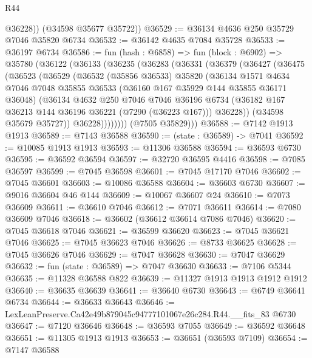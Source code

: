 \begin{lexlean}{R44}
\begin{coremodule}
{          @36228))
      (@34598 @35677 @35722))
@36529 := @36134 @4636 @250 @35729 @7046 @35820 @6734
@36532 := @36142 @4635 @7084 @35728
@36533 := @36197 @6734
@36586 := fun (hash : @6858) =>
  fun (block : @6902) =>
  @35780
    (@36122
      (@36133
        (@36235
          (@36283
            (@36331
              (@36379
                (@36427
                  (@36475
                    (@36523
                      (@36529
                        (@36532
                          (@35856 @36533)
                          @35820
                          (@36134
                            @1571
                            @4634
                            @7046
                            @7048
                            @35855
                            @36533
                            (@36160 @167 @35929 @144 @35855 @36171 @36048)
                            (@36134
                              @4632
                              @250
                              @7046
                              @7046
                              @36196
                              @6734
                              (@36182 @167 @36213 @144 @36196 @36221 (@7290 (@36223 @167)))
                              @36228))
                          (@34598 @35679 @35727))
                        @36228))))))))
        (@7505 @35829)))
@36588 := @7142 @1913 @1913
@36589 := @7143 @36588
@36590 := (state : @36589) -> @7041
@36592 := @10085 @1913 @1913
@36593 := @11306 @36588
@36594 := @36593 @6730
@36595 := @36592 @36594
@36597 := @32720 @36595 @4416
@36598 := @7085 @36597
@36599 := @7045 @36598
@36601 := @7045 @17170 @7046
@36602 := @7045 @36601
@36603 := @10086 @36588
@36604 := @36603 @6730
@36607 := @9016 @36604 @46 @144
@36609 := @10067 @36607 @24
@36610 := @7073 @36609
@36611 := @36610 @7046
@36612 := @7071 @36611
@36614 := @7080 @36609 @7046
@36618 := @36602 (@36612 @36614 @7086 @7046)
@36620 := @7045 @36618 @7046
@36621 := @36599 @36620
@36623 := @7045 @36621 @7046
@36625 := @7045 @36623 @7046
@36626 := @8733 @36625
@36628 := @7045 @36626 @7046
@36629 := @7047 @36628
@36630 := @7047 @36629
@36632 := fun (state : @36589) => @7047 @36630
@36633 := @7106 @5344
@36635 := @11328 @36588 @822
@36639 := @11327 @1913 @1913 @1912 @1912
@36640 := @36635 @36639
@36641 := @36640 @6730
@36643 := @6749 @36641 @6734
@36644 := @36633 @36643
@36646 := LexLeanPreserve.Ca42e49b879045c94777101067e26c284.R44.__fits_83 @6730
@36647 := @7120 @36646
@36648 := @36593 @7055
@36649 := @36592 @36648
@36651 := @11305 @1913 @1913
@36653 := @36651 (@36593 @7109)
@36654 := @7147 @36588
}
\end{coremodule}
\end{lexlean}
